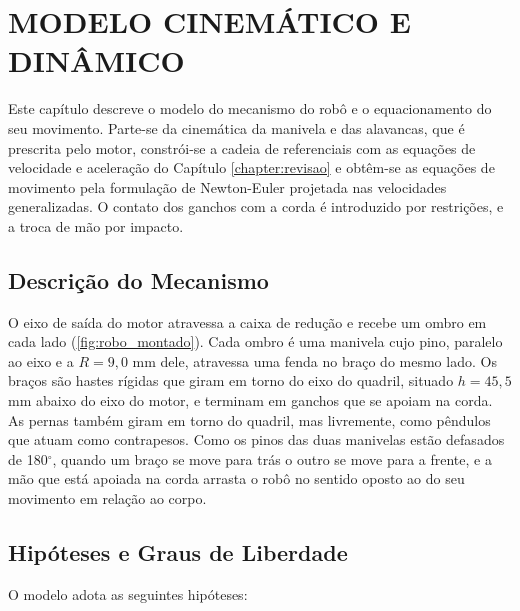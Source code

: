 \chapter{MODELO CINEMÁTICO E DINÂMICO}
\label{chapter:modelo}

Este capítulo descreve o modelo do mecanismo do robô e o equacionamento do seu movimento. Parte-se da cinemática da manivela e das alavancas, que é prescrita pelo motor, constrói-se a cadeia de referenciais com as equações de velocidade e aceleração do Capítulo \ref{chapter:revisao} e obtêm-se as equações de movimento pela formulação de Newton-Euler projetada nas velocidades generalizadas. O contato dos ganchos com a corda é introduzido por restrições, e a troca de mão por impacto.

\section{Descrição do Mecanismo}
\label{sec:mecanismo}

O eixo de saída do motor atravessa a caixa de redução e recebe um ombro em cada lado (\ref{fig:robo_montado}). Cada ombro é uma manivela cujo pino, paralelo ao eixo e a $R=9{,}0$ mm dele, atravessa uma fenda no braço do mesmo lado. Os braços são hastes rígidas que giram em torno do eixo do quadril, situado $h=45{,}5$ mm abaixo do eixo do motor, e terminam em ganchos que se apoiam na corda. As pernas também giram em torno do quadril, mas livremente, como pêndulos que atuam como contrapesos. Como os pinos das duas manivelas estão defasados de 180$^\circ$, quando um braço se move para trás o outro se move para a frente, e a mão que está apoiada na corda arrasta o robô no sentido oposto ao do seu movimento em relação ao corpo.

\section{Hipóteses e Graus de Liberdade}
\label{sec:hipoteses}

O modelo adota as seguintes hipóteses:

